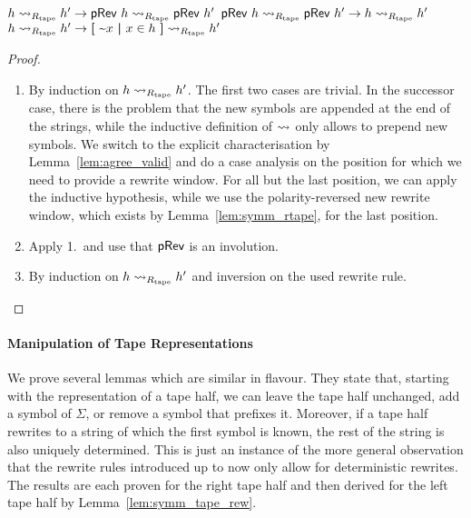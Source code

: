 \begin{lemma}\label{lem:symm_tape_rew}\leavevmode
  \begin{enumerate}
     $h \rightsquigarrow_{R_{\text{tape}}} h' \rightarrow \textsf{pRev}~h \rightsquigarrow_{R_{\text{tape}}} \textsf{pRev}~h'$ 
     $\textsf{pRev}~h \rightsquigarrow_{R_{\text{tape}}} \textsf{pRev}~h' \rightarrow h \rightsquigarrow_{R_{\text{tape}}} h'$
     $h \rightsquigarrow_{R_{\text{tape}}} h' \rightarrow \textbf{[}~ \text{\textasciitilde}x ~\textbf{|}~ x \in h ~\textbf{]} \rightsquigarrow_{R_{\text{tape}}} h'$
  \end{enumerate}
\end{lemma}
\begin{proof}
  \begin{enumerate}
    \item By induction on $h \rightsquigarrow_{R_{\text{tape}}} h'$. The first two cases are trivial. 
      In the successor case, there is the problem that the new symbols are appended at the end of the strings, while the inductive definition of $\rightsquigarrow_{}$ only allows to prepend new symbols. We switch to the explicit characterisation by Lemma~\ref{lem:agree_valid} and do a case analysis on the position for which we need to provide a rewrite window. For all but the last position, we can apply the inductive hypothesis, while we use the polarity-reversed new rewrite window, which exists by Lemma~\ref{lem:symm_rtape}, for the last position.
    \item Apply 1.\ and use that $\textsf{pRev}$ is an involution.
    \item By induction on $h \rightsquigarrow_{R_{\text{tape}}} h'$ and inversion on the used rewrite rule.
  \end{enumerate}
\end{proof}


\paragraph{Manipulation of Tape Representations}

We prove several lemmas which are similar in flavour. They state that, starting with the representation of a tape half, we can leave the tape half unchanged, add a symbol of $\Sigma$, or remove a symbol that prefixes it. Moreover, if a tape half rewrites to a string of which the first symbol is known, the rest of the string is also uniquely determined. This is just an instance of the more general observation that the rewrite rules introduced up to now only allow for deterministic rewrites.
The results are each proven for the right tape half and then derived for the left tape half by Lemma~\ref{lem:symm_tape_rew}. 

